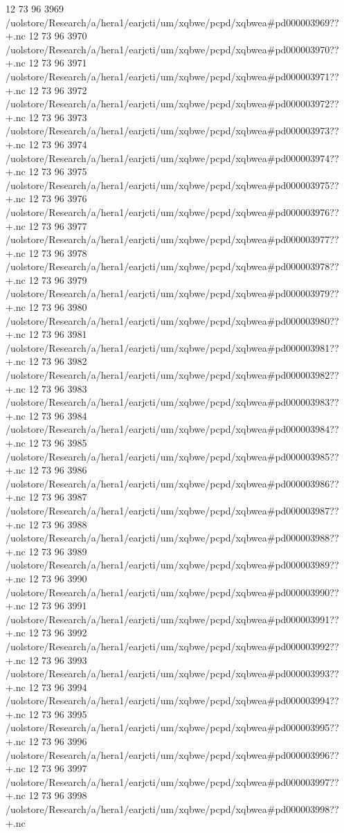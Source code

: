 12 73 96
3969
/uolstore/Research/a/hera1/earjcti/um/xqbwe/pcpd/xqbwea#pd000003969??+.nc
12 73 96
3970
/uolstore/Research/a/hera1/earjcti/um/xqbwe/pcpd/xqbwea#pd000003970??+.nc
12 73 96
3971
/uolstore/Research/a/hera1/earjcti/um/xqbwe/pcpd/xqbwea#pd000003971??+.nc
12 73 96
3972
/uolstore/Research/a/hera1/earjcti/um/xqbwe/pcpd/xqbwea#pd000003972??+.nc
12 73 96
3973
/uolstore/Research/a/hera1/earjcti/um/xqbwe/pcpd/xqbwea#pd000003973??+.nc
12 73 96
3974
/uolstore/Research/a/hera1/earjcti/um/xqbwe/pcpd/xqbwea#pd000003974??+.nc
12 73 96
3975
/uolstore/Research/a/hera1/earjcti/um/xqbwe/pcpd/xqbwea#pd000003975??+.nc
12 73 96
3976
/uolstore/Research/a/hera1/earjcti/um/xqbwe/pcpd/xqbwea#pd000003976??+.nc
12 73 96
3977
/uolstore/Research/a/hera1/earjcti/um/xqbwe/pcpd/xqbwea#pd000003977??+.nc
12 73 96
3978
/uolstore/Research/a/hera1/earjcti/um/xqbwe/pcpd/xqbwea#pd000003978??+.nc
12 73 96
3979
/uolstore/Research/a/hera1/earjcti/um/xqbwe/pcpd/xqbwea#pd000003979??+.nc
12 73 96
3980
/uolstore/Research/a/hera1/earjcti/um/xqbwe/pcpd/xqbwea#pd000003980??+.nc
12 73 96
3981
/uolstore/Research/a/hera1/earjcti/um/xqbwe/pcpd/xqbwea#pd000003981??+.nc
12 73 96
3982
/uolstore/Research/a/hera1/earjcti/um/xqbwe/pcpd/xqbwea#pd000003982??+.nc
12 73 96
3983
/uolstore/Research/a/hera1/earjcti/um/xqbwe/pcpd/xqbwea#pd000003983??+.nc
12 73 96
3984
/uolstore/Research/a/hera1/earjcti/um/xqbwe/pcpd/xqbwea#pd000003984??+.nc
12 73 96
3985
/uolstore/Research/a/hera1/earjcti/um/xqbwe/pcpd/xqbwea#pd000003985??+.nc
12 73 96
3986
/uolstore/Research/a/hera1/earjcti/um/xqbwe/pcpd/xqbwea#pd000003986??+.nc
12 73 96
3987
/uolstore/Research/a/hera1/earjcti/um/xqbwe/pcpd/xqbwea#pd000003987??+.nc
12 73 96
3988
/uolstore/Research/a/hera1/earjcti/um/xqbwe/pcpd/xqbwea#pd000003988??+.nc
12 73 96
3989
/uolstore/Research/a/hera1/earjcti/um/xqbwe/pcpd/xqbwea#pd000003989??+.nc
12 73 96
3990
/uolstore/Research/a/hera1/earjcti/um/xqbwe/pcpd/xqbwea#pd000003990??+.nc
12 73 96
3991
/uolstore/Research/a/hera1/earjcti/um/xqbwe/pcpd/xqbwea#pd000003991??+.nc
12 73 96
3992
/uolstore/Research/a/hera1/earjcti/um/xqbwe/pcpd/xqbwea#pd000003992??+.nc
12 73 96
3993
/uolstore/Research/a/hera1/earjcti/um/xqbwe/pcpd/xqbwea#pd000003993??+.nc
12 73 96
3994
/uolstore/Research/a/hera1/earjcti/um/xqbwe/pcpd/xqbwea#pd000003994??+.nc
12 73 96
3995
/uolstore/Research/a/hera1/earjcti/um/xqbwe/pcpd/xqbwea#pd000003995??+.nc
12 73 96
3996
/uolstore/Research/a/hera1/earjcti/um/xqbwe/pcpd/xqbwea#pd000003996??+.nc
12 73 96
3997
/uolstore/Research/a/hera1/earjcti/um/xqbwe/pcpd/xqbwea#pd000003997??+.nc
12 73 96
3998
/uolstore/Research/a/hera1/earjcti/um/xqbwe/pcpd/xqbwea#pd000003998??+.nc
